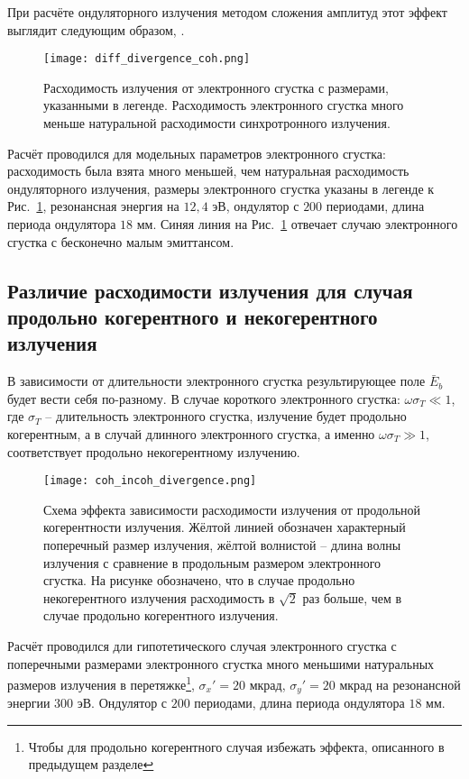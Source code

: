 При расчёте ондуляторного излучения методом сложения амплитуд этот эффект выглядит следующим образом, .
\begin{figure}[H] 
	\centering 	\texttt{[image: diff\_divergence\_coh.png]}
	\caption{Расходимость излучения от электронного сгустка с размерами, указанными в легенде. Расходимость электронного сгустка много меньше натуральной расходимости синхротронного излучения.}
	\label{fig:diff_coh_incoh_rad}
\end{figure}
Расчёт проводился для модельных параметров электронного сгустка: расходимость была взята много меньшей, чем натуральная расходимость ондуляторного излучения, размеры электронного сгустка указаны в легенде к Рис.~\ref{fig:diff_coh_incoh_rad}, резонансная энергия на $12,4$ эВ, ондулятор с $200$ периодами, длина периода ондулятора $18$ мм. Синяя линия на Рис.~\ref{fig:diff_coh_incoh_rad} отвечает случаю электронного сгустка с бесконечно малым эмиттансом.

\subsection{Различие расходимости излучения для случая продольно когерентного и некогерентного излучения}
В зависимости от длительности электронного сгустка результирующее поле $\bar{E}_{b}$ будет вести себя по-разному. В случае короткого электронного сгустка: $\omega \sigma_T \ll 1$, где $\sigma_T$ -- длительность электронного сгустка, излучение будет продольно когерентным, а в случай длинного электронного сгустка, а именно  $\omega \sigma_T \gg 1$, соответствует продольно некогерентному излучению. 

\begin{figure}[H] 
	\centering 	\texttt{[image: coh\_incoh\_divergence.png]}
	\caption{Схема эффекта зависимости расходимости излучения от продольной когерентности излучения. Жёлтой линией обозначен характерный поперечный размер излучения, жёлтой волнистой -- длина волны излучения с сравнение в продольным размером электронного сгустка. На рисунке обозначено, что в случае продольно некогерентного излучения расходимость в $\sqrt{2}$ раз больше, чем в случае продольно когерентного излучения.}
	\label{fig:coh_incoh_divergence}
\end{figure}
Расчёт проводился дли гипотетического случая электронного сгустка с поперечными размерами электронного сгустка много меньшими натуральных размеров излучения в перетяжке\footnote{Чтобы для продольно когерентного случая избежать эффекта, описанного в предыдущем разделе}, $\sigma_x' = 20$ мкрад, $\sigma_y' = 20$ мкрад на резонансной энергии $300$ эВ. Ондулятор с $200$ периодами, длина периода ондулятора $18$ мм. 

